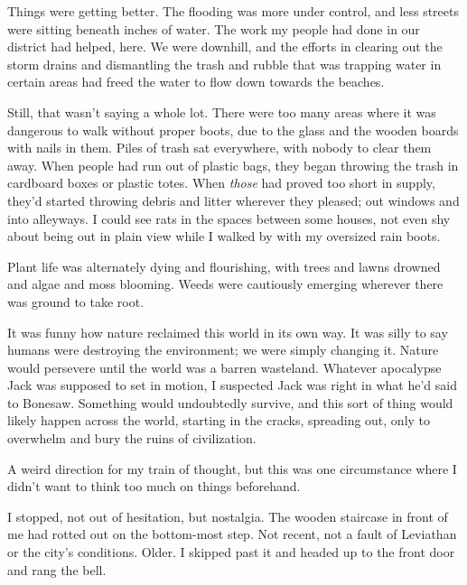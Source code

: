 Things were getting better.  The flooding was more under control, and less streets were sitting beneath inches of water.  The work my people had done in our district had helped, here.  We were downhill, and the efforts in clearing out the storm drains and dismantling the trash and rubble that was trapping water in certain areas had freed the water to flow down towards the beaches.



Still, that wasn't saying a whole lot.  There were too many areas where it was dangerous to walk without proper boots, due to the glass and the wooden boards with nails in them. Piles of trash sat everywhere, with nobody to clear them away.  When people had run out of plastic bags, they began throwing the trash in cardboard boxes or plastic totes.  When \emph{those} had proved too short in supply, they'd started throwing debris and litter wherever they pleased; out windows and into alleyways.  I could see rats in the spaces between some houses, not even shy about being out in plain view while I walked by with my oversized rain boots.



Plant life was alternately dying and flourishing, with trees and lawns drowned and algae and moss blooming.  Weeds were cautiously emerging wherever there was ground to take root.



It was funny how nature reclaimed this world in its own way.  It was silly to say humans were destroying the environment; we were simply changing it.  Nature would persevere until the world was a barren wasteland.  Whatever apocalypse Jack was supposed to set in motion, I suspected Jack was right in what he'd said to Bonesaw.  Something would undoubtedly survive, and this sort of thing would likely happen across the world, starting in the cracks, spreading out, only to overwhelm and bury the ruins of civilization.



A weird direction for my train of thought, but this was one circumstance where I didn't want to think too much on things beforehand.



I stopped, not out of hesitation, but nostalgia.  The wooden staircase in front of me had rotted out on the bottom-most step.  Not recent, not a fault of Leviathan or the city's conditions.  Older.  I skipped past it and headed up to the front door and rang the bell.



